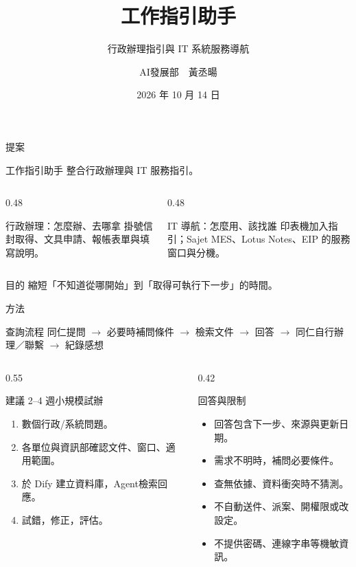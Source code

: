 \documentclass[aspectratio=169,12pt]{beamer}
\title[工作指引助手]{工作指引助手}
\subtitle{行政辦理指引與 IT 系統服務導航}
\author{AI發展部　黃丞暘}
\date{2026 年 10 月 14 日}
\begin{document}
\begin{frame}
\titlepage
\end{frame}

\begin{frame}{提案}
\small
\begin{block}{工作指引助手}
整合行政辦理與 IT 服務指引。
\end{block}
\begin{columns}[T,onlytextwidth]
\begin{column}{0.48\textwidth}
\begin{block}{行政辦理：怎麼辦、去哪拿}
掛號信封取得、文具申請、報帳表單與填寫說明。
\end{block}
\end{column}
\begin{column}{0.48\textwidth}
\begin{block}{IT 導航：怎麼用、該找誰}
印表機加入指引；Sajet MES、Lotus Notes、EIP 的服務窗口與分機。
\end{block}
\end{column}
\end{columns}
\begin{alertblock}{目的}
縮短「不知道從哪開始」到「取得可執行下一步」的時間。\\
\end{alertblock}
\end{frame}

\begin{frame}{方法}
\footnotesize
\begin{block}{查詢流程}
同仁提問 $\rightarrow$ 必要時補問條件 $\rightarrow$ 檢索文件
$\rightarrow$ 回答 $\rightarrow$ 同仁自行辦理／聯繫 $\rightarrow$ 紀錄感想
\end{block}
\begin{columns}[T,onlytextwidth]
\begin{column}{0.55\textwidth}
\begin{block}{建議 2--4 週小規模試辦}
\begin{enumerate}
\item 數個行政/系統問題。
\item 各單位與資訊部確認文件、窗口、適用範圍。
\item 於 Dify 建立資料庫，Agent檢索回應。
\item 試錯，修正，評估。
\end{enumerate}
\end{block}
\end{column}
\begin{column}{0.42\textwidth}
\begin{alertblock}{回答與限制}
\begin{itemize}
\item 回答包含下一步、來源與更新日期。
\item 需求不明時，補問必要條件。
\item 查無依據、資料衝突時不猜測。
\item 不自動送件、派案、開權限或改設定。
\item 不提供密碼、連線字串等機敏資訊。
\end{itemize}
\end{alertblock}
\end{column}
\end{columns}
\end{frame}
\end{document}
